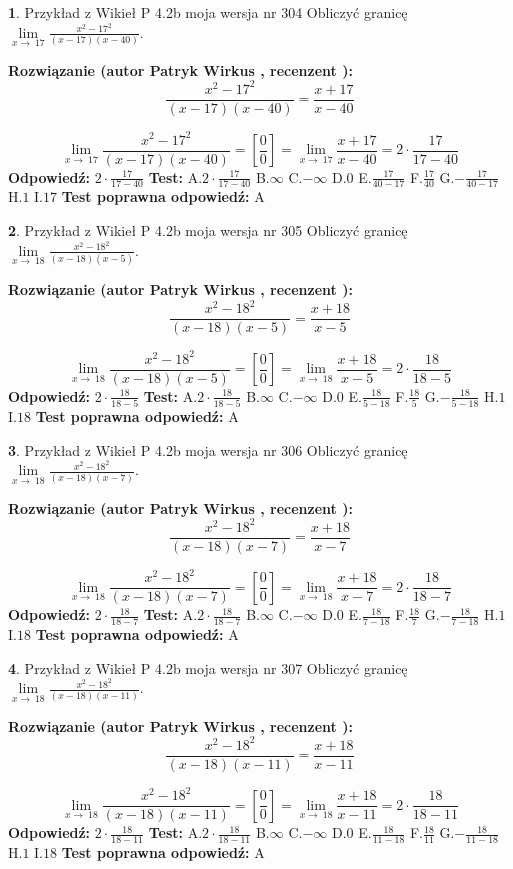 \documentclass[12pt, a4paper]{article}
\theoremstyle{definition} %
\newtheorem{zad}{}
\newcommand{\zadStart}[1]{\begin{zad}#1\newline}
\newcommand{\zadStop}{\end{zad}}
\newcommand{\rozwStart}[2]{\noindent \textbf{Rozwiązanie (autor #1 , recenzent #2): }\newline}
\newcommand{\rozwStop}{\newline}
\newcommand{\odpStart}{\noindent \textbf{Odpowiedź:}\newline}
\newcommand{\odpStop}{\newline}
\newcommand{\testStart}{\noindent \textbf{Test:}\newline}
\newcommand{\testStop}{\newline}
\newcommand{\kluczStart}{\noindent \textbf{Test poprawna odpowiedź:}\newline}
\newcommand{\kluczStop}{\newline}
\begin{document}
\zadStart{Przykład z Wikieł P 4.2b moja wersja nr 304}
Obliczyć granicę $\lim\limits_{x\to\ 17}\frac{x^{2}-17^{2}}{(x-17)(x-40)}$.
\zadStop
\rozwStart{Patryk Wirkus}{}
$$\frac{x^{2}-17^{2}}{(x-17)(x-40)}=\frac{x+17}{x-40}$$

$$\lim\limits_{x\to\ 17}\frac{x^{2}-17^{2}}{(x-17)(x-40)}=[\frac{0}{0}]=\lim\limits_{x\to\ 17}\frac{x+17}{x-40}=2 \cdot \frac{17}{17-40}$$
\rozwStop
\odpStart
$2 \cdot \frac{17}{17-40}$
\odpStop
\testStart
A.$2 \cdot \frac{17}{17-40}$
B.$\infty$
C.$-\infty$
D.$0$
E.$\frac{17}{40-17}$
F.$\frac{17}{40}$
G.$-\frac{17}{40-17}$
H.$1$
I.$17$
\testStop
\kluczStart
A
\kluczStop



\zadStart{Przykład z Wikieł P 4.2b moja wersja nr 305}
Obliczyć granicę $\lim\limits_{x\to\ 18}\frac{x^{2}-18^{2}}{(x-18)(x-5)}$.
\zadStop
\rozwStart{Patryk Wirkus}{}
$$\frac{x^{2}-18^{2}}{(x-18)(x-5)}=\frac{x+18}{x-5}$$

$$\lim\limits_{x\to\ 18}\frac{x^{2}-18^{2}}{(x-18)(x-5)}=[\frac{0}{0}]=\lim\limits_{x\to\ 18}\frac{x+18}{x-5}=2 \cdot \frac{18}{18-5}$$
\rozwStop
\odpStart
$2 \cdot \frac{18}{18-5}$
\odpStop
\testStart
A.$2 \cdot \frac{18}{18-5}$
B.$\infty$
C.$-\infty$
D.$0$
E.$\frac{18}{5-18}$
F.$\frac{18}{5}$
G.$-\frac{18}{5-18}$
H.$1$
I.$18$
\testStop
\kluczStart
A
\kluczStop



\zadStart{Przykład z Wikieł P 4.2b moja wersja nr 306}
Obliczyć granicę $\lim\limits_{x\to\ 18}\frac{x^{2}-18^{2}}{(x-18)(x-7)}$.
\zadStop
\rozwStart{Patryk Wirkus}{}
$$\frac{x^{2}-18^{2}}{(x-18)(x-7)}=\frac{x+18}{x-7}$$

$$\lim\limits_{x\to\ 18}\frac{x^{2}-18^{2}}{(x-18)(x-7)}=[\frac{0}{0}]=\lim\limits_{x\to\ 18}\frac{x+18}{x-7}=2 \cdot \frac{18}{18-7}$$
\rozwStop
\odpStart
$2 \cdot \frac{18}{18-7}$
\odpStop
\testStart
A.$2 \cdot \frac{18}{18-7}$
B.$\infty$
C.$-\infty$
D.$0$
E.$\frac{18}{7-18}$
F.$\frac{18}{7}$
G.$-\frac{18}{7-18}$
H.$1$
I.$18$
\testStop
\kluczStart
A
\kluczStop



\zadStart{Przykład z Wikieł P 4.2b moja wersja nr 307}
Obliczyć granicę $\lim\limits_{x\to\ 18}\frac{x^{2}-18^{2}}{(x-18)(x-11)}$.
\zadStop
\rozwStart{Patryk Wirkus}{}
$$\frac{x^{2}-18^{2}}{(x-18)(x-11)}=\frac{x+18}{x-11}$$

$$\lim\limits_{x\to\ 18}\frac{x^{2}-18^{2}}{(x-18)(x-11)}=[\frac{0}{0}]=\lim\limits_{x\to\ 18}\frac{x+18}{x-11}=2 \cdot \frac{18}{18-11}$$
\rozwStop
\odpStart
$2 \cdot \frac{18}{18-11}$
\odpStop
\testStart
A.$2 \cdot \frac{18}{18-11}$
B.$\infty$
C.$-\infty$
D.$0$
E.$\frac{18}{11-18}$
F.$\frac{18}{11}$
G.$-\frac{18}{11-18}$
H.$1$
I.$18$
\testStop
\kluczStart
A
\kluczStop
\end{document}
